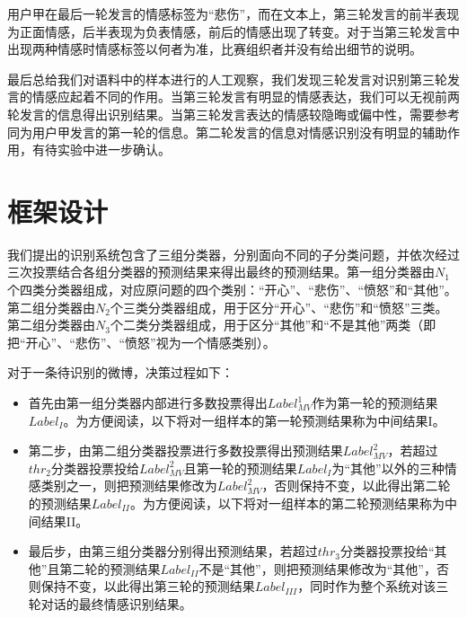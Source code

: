 用户甲在最后一轮发言的情感标签为“悲伤”，而在文本上，第三轮发言的前半表现为正面情感，后半表现为负表情感，前后的情感出现了转变。对于当第三轮发言中出现两种情感时情感标签以何者为准，比赛组织者并没有给出细节的说明。

最后总给我们对语料中的样本进行的人工观察，我们发现三轮发言对识别第三轮发言的情感应起着不同的作用。当第三轮发言有明显的情感表达，我们可以无视前两轮发言的信息得出识别结果。当第三轮发言表达的情感较隐晦或偏中性，需要参考同为用户甲发言的第一轮的信息。第二轮发言的信息对情感识别没有明显的辅助作用，有待实验中进一步确认。

\section{框架设计}
\label{sec:exp_context_emo_framework}

我们提出的识别系统包含了三组分类器，分别面向不同的子分类问题，并依次经过三次投票结合各组分类器的预测结果来得出最终的预测结果。第一组分类器由$N_1$个四类分类器组成，对应原问题的四个类别：“开心”、“悲伤”、“愤怒”和“其他”。第二组分类器由$N_2$个三类分类器组成，用于区分“开心”、“悲伤”和“愤怒”三类。第二组分类器由$N_3$个二类分类器组成，用于区分“其他”和“不是其他”两类（即把“开心”、“悲伤”、“愤怒”视为一个情感类别）。

对于一条待识别的微博，决策过程如下：

\begin{itemize}

\item 首先由第一组分类器内部进行多数投票得出$Label^{1}_{MV}$作为第一轮的预测结果$Label_{I}$。为方便阅读，以下将对一组样本的第一轮预测结果称为中间结果I。

\item 第二步，由第二组分类器投票进行多数投票得出预测结果$Label^{2}_{MV}$，若超过$thr_{2}$分类器投票投给$Label^{2}_{MV}$且第一轮的预测结果$Label_{I}$为“其他”以外的三种情感类别之一，则把预测结果修改为$Label^{2}_{MV}$，否则保持不变，以此得出第二轮的预测结果$Label_{II}$。为方便阅读，以下将对一组样本的第二轮预测结果称为中间结果II。

\item 最后步，由第三组分类器分别得出预测结果，若超过$thr_{3}$分类器投票投给“其他”且第二轮的预测结果$Label_{II}$不是“其他”，则把预测结果修改为“其他”，否则保持不变，以此得出第三轮的预测结果$Label_{III}$，同时作为整个系统对该三轮对话的最终情感识别结果。

\end{itemize}

